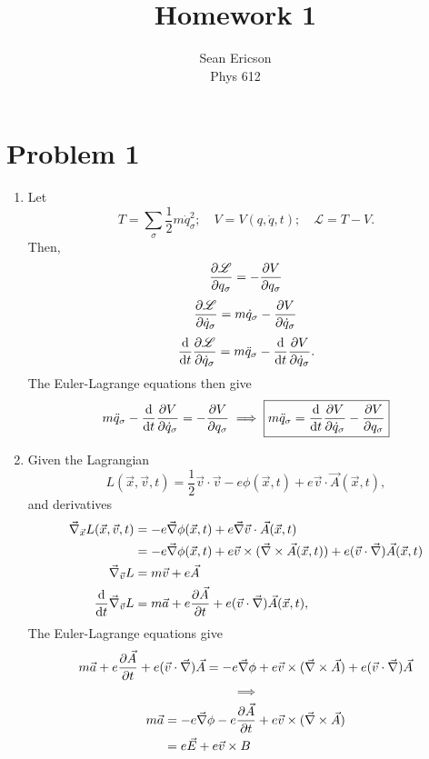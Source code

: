 \documentclass[12pt]{article}
\newcommand{\vecnabla}{\vec{\nabla}}
\begin{document}
\title{Homework 1}
\author{Sean Ericson \\ Phys 612}
\maketitle

\section*{Problem 1}
\begin{enumerate}[label=\roman*.]
    \item Let
    \[ T = \sum_\sigma\frac{1}{2}m\dot{q}_\sigma^2; \quad V = V(q,\dot{q}, t); \quad \mathscr{L} = T - V. \]
    Then,
    \[ \pdv{\mathscr{L}}{q_\sigma} = - \pdv{V}{q_\sigma} \]
    \[ \pdv{\mathscr{L}}{\dot{q}_\sigma} = m\dot{q}_\sigma - \pdv{V}{\dot{q}_\sigma} \]
    \[ \dv{t}\pdv{\mathscr{L}}{\dot{q}_\sigma} = m\ddot{q}_\sigma - \dv{t}\pdv{V}{\dot{q}_\sigma}.  \]
    The Euler-Lagrange equations then give
    \[ m\ddot{q}_\sigma - \dv{t}\pdv{V}{\dot{q}_\sigma} = - \pdv{V}{q_\sigma} \implies \boxed{m\ddot{q}_\sigma = \dv{t}\pdv{V}{\dot{q}_\sigma} - \pdv{V}{q_\sigma}} \]
    
    \item Given the Lagrangian
    \[ L(\vec{x}, \vec{v}, t) = \frac{1}{2}\vec{v}\cdot\vec{v} - e\phi(\vec{x}, t) + e\vec{v}\cdot{\vec{A}(\vec{x}, t)}, \]
    and derivatives
    \begin{align*}
        \vecnabla_{\vec{x}}L(\vec{x}, \vec{v}, t) &= -e\vecnabla\phi(\vec{x}, t) + e\vecnabla\vec{v}\cdot\vec{A}(\vec{x}, t) \\
        &= -e\vecnabla\phi(\vec{x}, t) + e \vec{v}\times(\vecnabla\times\vec{A}(\vec{x}, t)) + e(\vec{v}\cdot\vecnabla)\vec{A}(\vec{x}, t) \\
        \vecnabla_{\vec{v}}L &= m\vec{v} + e\vec{A} \\
        \dv{t}\vecnabla_{\vec{v}}L &= m\vec{a} + e\pdv{\vec{A}}{t} + e(\vec{v}\cdot\vecnabla)\vec{A}(\vec{x}, t),
    \end{align*}
    The Euler-Lagrange equations give
    \[ m\vec{a} + e\pdv{\vec{A}}{t} + e(\vec{v}\cdot\vecnabla)\vec{A} = -e\vecnabla\phi + e \vec{v}\times(\vecnabla\times\vec{A}) + e(\vec{v}\cdot\vecnabla)\vec{A} \]
    \[ \implies  \]
    \begin{align*}
        m\vec{a} &= -e\vecnabla\phi - e\pdv{\vec{A}}{t} + e \vec{v}\times(\vecnabla\times\vec{A}) \\
        &= e\vec{E} + e\vec{v}\times{B}
    \end{align*}


\end{enumerate}
\end{document}

